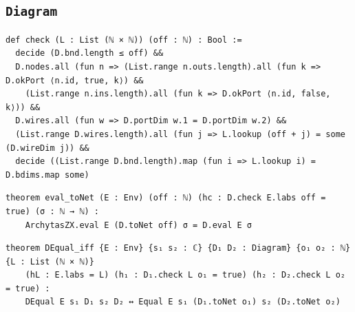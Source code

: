 \subsection{\texttt{Diagram}}
\begin{lstlisting}[style=leancore]
def check (L : List (ℕ × ℕ)) (off : ℕ) : Bool :=
  decide (D.bnd.length ≤ off) &&
  D.nodes.all (fun n => (List.range n.outs.length).all (fun k => D.okPort ⟨n.id, true, k⟩) &&
    (List.range n.ins.length).all (fun k => D.okPort ⟨n.id, false, k⟩)) &&
  D.wires.all (fun w => D.portDim w.1 = D.portDim w.2) &&
  (List.range D.wires.length).all (fun j => L.lookup (off + j) = some (D.wireDim j)) &&
  decide ((List.range D.bnd.length).map (fun i => L.lookup i) = D.bdims.map some)
\end{lstlisting}
\begin{lstlisting}[style=leancore]
theorem eval_toNet (E : Env) (off : ℕ) (hc : D.check E.labs off = true) (σ : ℕ → ℕ) :
    ArchytasZX.eval E (D.toNet off) σ = D.eval E σ
\end{lstlisting}
\begin{lstlisting}[style=leancore]
theorem DEqual_iff {E : Env} {s₁ s₂ : ℂ} {D₁ D₂ : Diagram} {o₁ o₂ : ℕ} {L : List (ℕ × ℕ)}
    (hL : E.labs = L) (h₁ : D₁.check L o₁ = true) (h₂ : D₂.check L o₂ = true) :
    DEqual E s₁ D₁ s₂ D₂ ↔ Equal E s₁ (D₁.toNet o₁) s₂ (D₂.toNet o₂)
\end{lstlisting}

